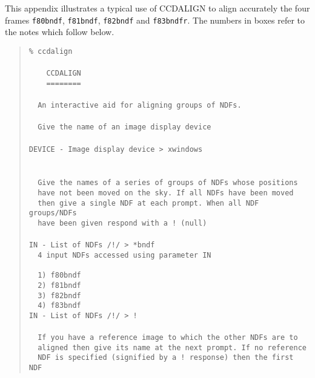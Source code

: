 This appendix illustrates a typical use of {\small CCDALIGN} to align
accurately the four frames \verb+f80bndf+, \verb+f81bndf+,
\verb+f82bndf+ and \verb+f83bndfr+. The numbers in boxes refer to the
notes which follow below.

\small
\begin{quote}
\begin{tabbing} %
\verb#% ccdalign #\\
\verb##\\
\verb#    CCDALIGN#\\
\verb#    ========#\\
\verb##\\
\verb#  An interactive aid for aligning groups of NDFs.#\\
\verb##\\
\verb#  Give the name of an image display device#\\
\verb##\\
\verb#DEVICE - Image display device > xwindows# \\
\verb##\\
\verb##\\
\verb#  Give the names of a series of groups of NDFs whose positions#\\
\verb#  have not been moved on the sky. If all NDFs have been moved#\\
\verb#  then give a single NDF at each prompt. When all NDF groups/NDFs#\\
\verb#  have been given respond with a ! (null)#\\
\verb##\\
\verb#IN - List of NDFs /!/ > *bndf# \\
\verb#  4 input NDFs accessed using parameter IN#\\
\verb#   #\\
\verb#  1) f80bndf#\\
\verb#  2) f81bndf#\\
\verb#  3) f82bndf#\\
\verb#  4) f83bndf#\\
\verb#IN - List of NDFs /!/ > !# \\
\verb##\\
\verb#  If you have a reference image to which the other NDFs are to#\\
\verb#  aligned then give its name at the next prompt. If no reference#\\
\verb#  NDF is specified (signified by a ! response) then the first NDF#\\

\end{tabbing}
\end{quote}
